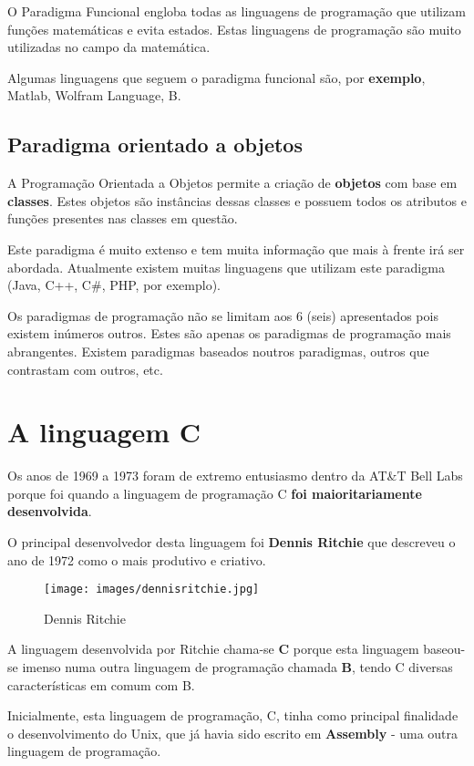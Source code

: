 O Paradigma Funcional engloba todas as linguagens de programação que utilizam funções matemáticas e evita estados. Estas linguagens de programação são muito utilizadas no campo da matemática. 

Algumas linguagens que seguem o paradigma funcional são, por \textbf{exemplo}, Matlab, Wolfram Language, B.

\subsection{Paradigma orientado a objetos}

A Programação Orientada a Objetos permite a criação de \textbf{objetos} com base em \textbf{classes}. Estes objetos são instâncias dessas classes e possuem todos os atributos e funções presentes nas classes em questão. 

Este paradigma é muito extenso e tem muita informação que mais à frente irá ser abordada. Atualmente existem muitas linguagens que utilizam este paradigma (Java, C++, C\#, PHP, por exemplo). 

\vspace{1em}

Os paradigmas de programação não se limitam aos 6 (seis) apresentados pois existem inúmeros outros. Estes são apenas os paradigmas de programação mais abrangentes. Existem paradigmas baseados noutros paradigmas, outros que contrastam com outros, etc.

\section{A linguagem C}

Os anos de 1969 a 1973 foram de extremo entusiasmo dentro da AT\&T Bell Labs porque foi quando a linguagem de programação C \textbf{foi maioritariamente desenvolvida}.

O principal desenvolvedor desta linguagem foi \textbf{Dennis Ritchie} que descreveu o ano de 1972 como o mais produtivo e criativo.

\begin{figure}[!h]
\center\texttt{[image: images/dennisritchie.jpg]}
\caption{Dennis Ritchie}
\end{figure}

A linguagem desenvolvida por Ritchie chama-se \textbf{C} porque esta linguagem baseou-se imenso numa outra linguagem de programação chamada \textbf{B}, tendo C diversas características em comum com B.

Inicialmente, esta linguagem de programação, C, tinha como principal finalidade o desenvolvimento do Unix, que já havia sido escrito em \textbf{Assembly} - uma outra linguagem de programação.

